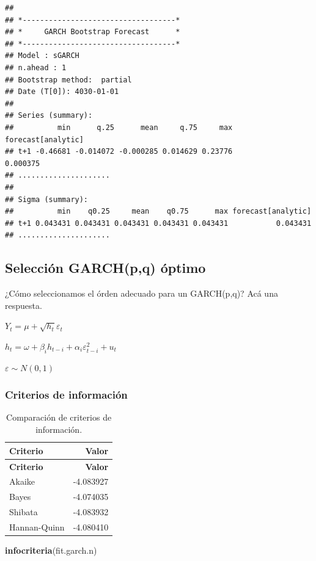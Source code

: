 \documentclass[
]{book}
\newenvironment{Shaded}{\begin{snugshade}}{\end{snugshade}}
\newcommand{\FunctionTok}[1]{\textcolor[rgb]{0.13,0.29,0.53}{\textbf{#1}}}
\newcommand{\NormalTok}[1]{#1}
\begin{document}
\begin{verbatim}
## 
## *-----------------------------------*
## *     GARCH Bootstrap Forecast      *
## *-----------------------------------*
## Model : sGARCH
## n.ahead : 1
## Bootstrap method:  partial
## Date (T[0]): 4030-01-01
## 
## Series (summary):
##          min      q.25      mean     q.75     max forecast[analytic]
## t+1 -0.46681 -0.014072 -0.000285 0.014629 0.23776           0.000375
## .....................
## 
## Sigma (summary):
##          min    q0.25     mean    q0.75      max forecast[analytic]
## t+1 0.043431 0.043431 0.043431 0.043431 0.043431           0.043431
## .....................
\end{verbatim}

\hypertarget{selecciuxf3n-garchpq-uxf3ptimo}{%
\subsection{Selección GARCH(p,q) óptimo}\label{selecciuxf3n-garchpq-uxf3ptimo}}

¿Cómo seleccionamos el órden adecuado para un GARCH(p,q)? Acá una respuesta.

\(Y_t = \mu+\sqrt{h_t}\varepsilon_t\)

\(h_t = \omega+\beta_ih_{t-i}+\alpha_i\varepsilon^2_{t-i}+u_t\)

\(\varepsilon \sim N(0,1)\)

\hypertarget{criterios-de-informaciuxf3n}{%
\subsubsection{Criterios de información}\label{criterios-de-informaciuxf3n}}

\begin{longtable}[]{@{}lr@{}}
\caption{\label{tab:info-criteria} Comparación de criterios de información.}\tabularnewline
\toprule\noalign{}
\textbf{Criterio} & \textbf{Valor} \\
\midrule\noalign{}
\endfirsthead
\toprule\noalign{}
\textbf{Criterio} & \textbf{Valor} \\
\midrule\noalign{}
\endhead
\bottomrule\noalign{}
\endlastfoot
Akaike & -4.083927 \\
Bayes & -4.074035 \\
Shibata & -4.083932 \\
Hannan-Quinn & -4.080410 \\
\end{longtable}

\begin{Shaded}
\begin{Highlighting}[]
\FunctionTok{infocriteria}\NormalTok{(fit.garch.n)}
\end{Highlighting}
\end{Shaded}
\end{document}
